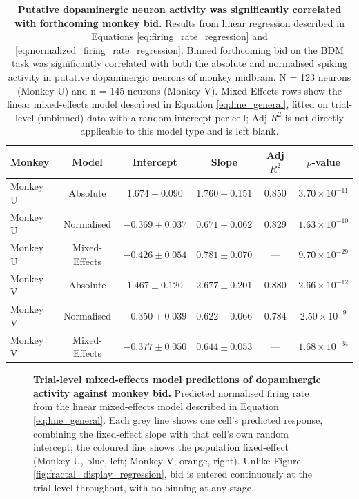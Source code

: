 \begin{table}[htbp]
\centering
\begin{tabular}{lccccc}
\hline
\textbf{Monkey} & \textbf{Model} & \textbf{Intercept} & \textbf{Slope} & \textbf{Adj $R^2$} & \textbf{$p$-value} \\
\hline
Monkey U & Absolute & $1.674 \pm 0.090$ & $1.760 \pm 0.151$ & 0.850 & $3.70 \times 10^{-11}$ \\
Monkey U & Normalised & $-0.369 \pm 0.037$ & $0.671 \pm 0.062$ & 0.829 & $1.63 \times 10^{-10}$ \\
Monkey U & Mixed-Effects & $-0.426 \pm 0.054$ & $0.781 \pm 0.070$ & --- & $9.70 \times 10^{-29}$ \\
\hline
Monkey V & Absolute & $1.467 \pm 0.120$ & $2.677 \pm 0.201$ & 0.880 & $2.66 \times 10^{-12}$ \\
Monkey V & Normalised & $-0.350 \pm 0.039$ & $0.622 \pm 0.066$ & 0.784 & $2.50 \times 10^{-9}$ \\
Monkey V & Mixed-Effects & $-0.377 \pm 0.050$ & $0.644 \pm 0.053$ & --- & $1.68 \times 10^{-34}$ \\
\hline
\end{tabular}
\caption[Putative dopaminergic neuron activity was significantly correlated with forthcoming monkey bid.]{\textbf{Putative dopaminergic neuron activity was significantly correlated with forthcoming monkey bid.} Results from linear regression described in Equations \ref{eq:firing_rate_regression} and \ref{eq:normalized_firing_rate_regression}. Binned forthcoming bid on the BDM task was significantly correlated with both the absolute and normalised spiking activity in putative dopaminergic neurons of monkey midbrain. N = 123 neurons (Monkey U) and n = 145 neurons (Monkey V). Mixed-Effects rows show the linear mixed-effects model described in Equation \ref{eq:lme_general}, fitted on trial-level (unbinned) data with a random intercept per cell; Adj $R^2$ is not directly applicable to this model type and is left blank.}
\label{tab:fd_regression_results}
\end{table}

\begin{figure}[htbp!]
\centering

\caption[Trial-level mixed-effects model predictions of dopaminergic activity against monkey bid.]{\textbf{Trial-level mixed-effects model predictions of dopaminergic activity against monkey bid.} Predicted normalised firing rate from the linear mixed-effects model described in Equation \ref{eq:lme_general}. Each grey line shows one cell's predicted response, combining the fixed-effect slope with that cell's own random intercept; the coloured line shows the population fixed-effect (Monkey U, blue, left; Monkey V, orange, right). Unlike Figure \ref{fig:fractal_display_regression}, bid is entered continuously at the trial level throughout, with no binning at any stage.}
\label{fig:fractal_display_lme_regression}
\end{figure}

